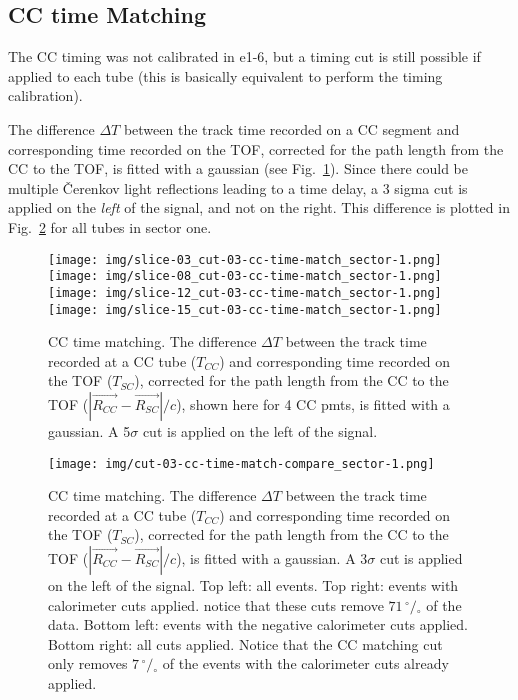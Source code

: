 \clearpage\newpage

\subsection{CC time Matching}
The CC timing was not calibrated in e1-6, but a timing cut is still possible if applied to each tube
(this is basically equivalent to perform the timing calibration).

The difference $\Delta T$ between the track time recorded on a CC segment and corresponding time recorded on the TOF,
corrected for the path length from the CC to the TOF, is fitted with a gaussian (see Fig.~\ref{fig:cc_time_slices}).
Since there could be multiple \v Cerenkov light reflections leading to a time delay,
a 3 sigma cut is applied on the {\it left} of the signal, and not on the right.
This difference is plotted in Fig.~\ref{fig:cc_time_sec1} for all tubes in sector one.

\begin{figure}[ht]
  \centering
		\texttt{[image: img/slice-03\_cut-03-cc-time-match\_sector-1.png]}
		\texttt{[image: img/slice-08\_cut-03-cc-time-match\_sector-1.png]}
		\texttt{[image: img/slice-12\_cut-03-cc-time-match\_sector-1.png]}
		\texttt{[image: img/slice-15\_cut-03-cc-time-match\_sector-1.png]}
		\caption{CC time matching. The difference $\Delta T$ between the track time recorded
               at a CC tube ($T_{CC}$) and corresponding time recorded on the TOF ($T_{SC}$),
               corrected for the path length from the CC to the TOF ($|\vec{R_{CC}}-\vec{R_{SC}}|/c$),
               shown here for 4 CC pmts, is fitted with a gaussian.
               A 5$\sigma$ cut is applied on the left of the signal.}
 		\label{fig:cc_time_slices}
\end{figure}

\begin{figure}[ht]
  \centering
		\texttt{[image: img/cut-03-cc-time-match-compare\_sector-1.png]}
		\caption{CC time matching. The difference $\Delta T$ between the track time recorded
               at a CC tube ($T_{CC}$) and corresponding time recorded on the TOF ($T_{SC}$),
               corrected for the path length from the CC to the TOF ($|\vec{R_{CC}}-\vec{R_{SC}}|/c$),
               is fitted with a gaussian. A 3$\sigma$ cut is applied on the left of the signal.
               Top left: all events. Top right: events with calorimeter cuts applied.
               notice that these cuts remove $71 \,^{\circ\!\!}/\!_\circ$ of the data.
               Bottom left: events with the negative calorimeter cuts applied.
               Bottom right: all cuts applied. Notice that the CC matching cut
               only removes $7  \,^{\circ\!\!}/\!_\circ$ of the events with
               the calorimeter cuts already applied.}
 		\label{fig:cc_time_sec1}
\end{figure}

